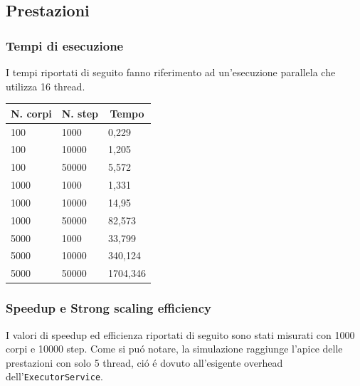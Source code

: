 \documentclass[report]{subfiles}
\begin{document}
\begin{center}
\begin{minipage}{.45\textwidth}
{}
		\end{minipage}
	\end{center}
	
	\subsection{Prestazioni}
	\subsubsection{Tempi di esecuzione}
	I tempi riportati di seguito fanno riferimento ad un'esecuzione parallela che utilizza 16 thread.
	\newline
	
	\begin{tabular}{|l|l|l|}
		\hline
		\multicolumn{1}{|c|}{\textbf{N. corpi}} & \multicolumn{1}{c|}{\textbf{N. step}} & \multicolumn{1}{c|}{\textbf{Tempo}} \\ \hline
		100 & 1000 & 0,229 \\ \hline
		100 & 10000 & 1,205 \\ \hline
		100 & 50000 & 5,572 \\ \hline
		1000 & 1000 & 1,331 \\ \hline
		1000 & 10000 & 14,95 \\ \hline
		1000 & 50000 & 82,573 \\ \hline
		5000 & 1000 & 33,799 \\ \hline
		5000 & 10000 & 340,124 \\ \hline
		5000 & 50000 & 1704,346 \\ \hline
	\end{tabular}
	
	\subsubsection{Speedup e Strong scaling efficiency}
	I valori di speedup ed efficienza riportati di seguito sono stati misurati con 1000 corpi e 10000 step. Come si pu\'o notare, la simulazione raggiunge l'apice delle prestazioni con solo 5 thread, ci\'o \'e dovuto all'esigente overhead dell'\texttt{ExecutorService}.
	
\end{document}
